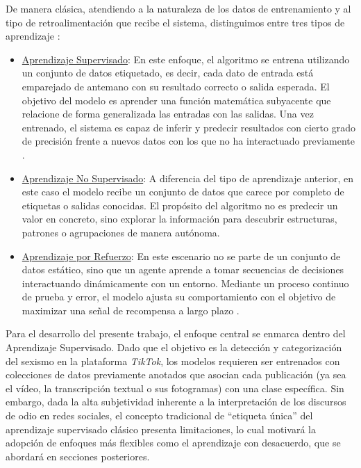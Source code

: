 De manera clásica, atendiendo a la naturaleza de los datos de entrenamiento y al tipo de retroalimentación que recibe el sistema, distinguimos entre tres tipos de aprendizaje \cite{bishop2006pattern}:
\begin{itemize}
    \item \underline{Aprendizaje Supervisado}: En este enfoque, el algoritmo se entrena utilizando un conjunto de datos etiquetado, es decir, cada dato de entrada está emparejado de antemano con su resultado correcto o salida esperada. El objetivo del modelo es aprender una función matemática subyacente que relacione de forma generalizada las entradas con las salidas. Una vez entrenado, el sistema es capaz de inferir y predecir resultados con cierto grado de precisión frente a nuevos datos con los que no ha interactuado previamente \cite{hastie2009elements}.
    \item \underline{Aprendizaje No Supervisado}: A diferencia del tipo de aprendizaje anterior, en este caso el modelo recibe un conjunto de datos que carece por completo de etiquetas o salidas conocidas. El propósito del algoritmo no es predecir un valor en concreto, sino explorar la información para descubrir estructuras, patrones o agrupaciones de manera autónoma. 
    \item \underline{Aprendizaje por Refuerzo}: En este escenario no se parte de un conjunto de datos estático, sino que un agente aprende a tomar secuencias de decisiones interactuando dinámicamente con un entorno. Mediante un proceso continuo de prueba y error, el modelo ajusta su comportamiento con el objetivo de maximizar una señal de recompensa a largo plazo \cite{barto2019reinforcement}.
\end{itemize}

Para el desarrollo del presente trabajo, el enfoque central se enmarca dentro del Aprendizaje Supervisado. Dado que el objetivo es la detección y categorización del sexismo en la plataforma \textit{TikTok}, los modelos requieren ser entrenados con colecciones de datos previamente anotados que asocian cada publicación (ya sea el vídeo, la transcripción textual o sus fotogramas) con una clase específica. Sin embargo, dada la alta subjetividad inherente a la interpretación de los discursos de odio en redes sociales, el concepto tradicional de ``etiqueta única'' del aprendizaje supervisado clásico presenta limitaciones, lo cual motivará la adopción de enfoques más flexibles como el aprendizaje con desacuerdo, que se abordará en secciones posteriores. 

